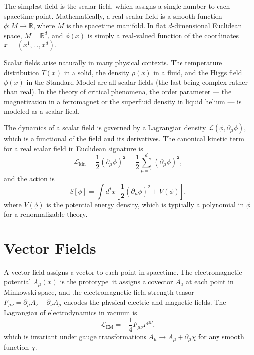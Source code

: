 \documentclass[11pt, twoside, openright]{book}
\theoremstyle{dotted}
\theoremstyle{definition}
\begin{document}
The simplest field is the scalar field, which assigns a single number to each
spacetime point. Mathematically, a real scalar field is a smooth function
$\phi: M \to \mathbb{R}$, where $M$ is the spacetime manifold. In flat
$d$-dimensional Euclidean space, $M = \mathbb{R}^d$, and $\phi(x)$ is simply a
real-valued function of the coordinates $x = (x^1, \ldots, x^d)$.

Scalar fields arise naturally in many physical contexts. The temperature
distribution $T(x)$ in a solid, the density $\rho(x)$ in a fluid, and the Higgs
field $\phi(x)$ in the Standard Model are all scalar fields (the last being complex
rather than real). In the theory of critical phenomena, the order parameter ---
the magnetization in a ferromagnet or the superfluid density in liquid helium --- is
modeled as a scalar field.

The dynamics of a scalar field is governed by a Lagrangian density
$\mathcal{L}(\phi, \partial_\mu \phi)$, which is a functional of the field and its
derivatives. The canonical kinetic term for a real scalar field in Euclidean
signature is
\begin{equation}
  \mathcal{L}_{\text{kin}} = \frac{1}{2}(\partial_\mu \phi)^2
  = \frac{1}{2}\sum_{\mu=1}^d (\partial_\mu \phi)^2,
  \label{eq:scalar_kinetic}
\end{equation}
and the action is
\begin{equation}
  S[\phi] = \int d^dx \left[\frac{1}{2}(\partial_\mu\phi)^2 + V(\phi)\right],
  \label{eq:scalar_action}
\end{equation}
where $V(\phi)$ is the potential energy density, which is typically a polynomial
in $\phi$ for a renormalizable theory.

\section{Vector Fields}

A vector field assigns a vector to each point in spacetime. The electromagnetic
potential $A_\mu(x)$ is the prototype: it assigns a covector $A_\mu$ at each point
in Minkowski space, and the electromagnetic field strength tensor $F_{\mu\nu} =
\partial_\mu A_\nu - \partial_\nu A_\mu$ encodes the physical electric and magnetic
fields. The Lagrangian of electrodynamics in vacuum is
\begin{equation}
  \mathcal{L}_{\mathrm{EM}} = -\frac{1}{4}F_{\mu\nu}F^{\mu\nu},
\end{equation}
which is invariant under gauge transformations $A_\mu \to A_\mu + \partial_\mu
\chi$ for any smooth function $\chi$.
\end{document}
